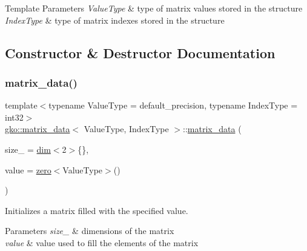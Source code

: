 \begin{DoxyTemplParams}{Template Parameters}
{\em Value\+Type} & type of matrix values stored in the structure \\
\hline
{\em Index\+Type} & type of matrix indexes stored in the structure \\
\hline
\end{DoxyTemplParams}


\subsection{Constructor \& Destructor Documentation}
\mbox{\label{structgko_1_1matrix__data_a4be80a4afbd7f905aa4e73fbeb9df762}} 
\subsubsection{\texorpdfstring{matrix\+\_\+data()}{matrix\_data()}\hspace{0.1cm}{\footnotesize\ttfamily [1/6]}}
{\footnotesize\ttfamily template$<$typename Value\+Type = default\+\_\+precision, typename Index\+Type = int32$>$ \\
\hyperlink{structgko_1_1matrix__data}{gko\+::matrix\+\_\+data}$<$ Value\+Type, Index\+Type $>$\+::\hyperlink{structgko_1_1matrix__data}{matrix\+\_\+data} (\begin{DoxyParamCaption}\item[{\hyperlink{structgko_1_1dim}{dim}$<$ 2 $>$}]{size\+\_\+ = {\ttfamily \hyperlink{structgko_1_1dim}{dim}$<$2$>$\{\}},  }\item[{Value\+Type}]{value = {\ttfamily \hyperlink{namespacegko_a70dbe01ff95c7b953d3d737424c6feb5}{zero}$<$ValueType$>$()} }\end{DoxyParamCaption})}



Initializes a matrix filled with the specified value. 


\begin{DoxyParams}{Parameters}
{\em size\+\_\+} & dimensions of the matrix \\
\hline
{\em value} & value used to fill the elements of the matrix \\
\hline
\end{DoxyParams}
\mbox{\label{structgko_1_1matrix__data_aea89944190aba3ace872bf31fd98fd3d}} 
